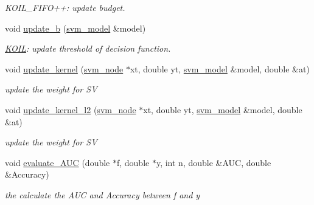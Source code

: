 \begin{DoxyCompactItemize}
\begin{DoxyCompactList}\small\item\em K\+O\+I\+L\+\_\+\+F\+I\+F\+O++\+: update budget. \end{DoxyCompactList}\item 
void \hyperlink{classKOIL_ac831cd779181338f8528591de98a51d8}{update\+\_\+b} (\hyperlink{structsvm__model}{svm\+\_\+model} \&model)
\begin{DoxyCompactList}\small\item\em \hyperlink{classKOIL}{K\+O\+I\+L}\+: update threshold of decision function. \end{DoxyCompactList}\item 
void \hyperlink{classKOIL_ad266706c4c77b6dc50b963140530599a}{update\+\_\+kernel} (\hyperlink{structsvm__node}{svm\+\_\+node} $\ast$xt, double yt, \hyperlink{structsvm__model}{svm\+\_\+model} \&model, double \&at)
\begin{DoxyCompactList}\small\item\em update the weight for S\+V \end{DoxyCompactList}\item 
void \hyperlink{classKOIL_a2d964c4947718b25ac8a850dae8af32c}{update\+\_\+kernel\+\_\+l2} (\hyperlink{structsvm__node}{svm\+\_\+node} $\ast$xt, double yt, \hyperlink{structsvm__model}{svm\+\_\+model} \&model, double \&at)
\begin{DoxyCompactList}\small\item\em update the weight for S\+V \end{DoxyCompactList}\item 
void \hyperlink{classKOIL_a4e6ac3a53e7e5f9fd7ee2f741345e749}{evaluate\+\_\+\+A\+U\+C} (double $\ast$f, double $\ast$y, int n, double \&A\+U\+C, double \&Accuracy)
\begin{DoxyCompactList}\small\item\em the calculate the A\+U\+C and Accuracy between f and y \end{DoxyCompactList}\end{DoxyCompactItemize}
